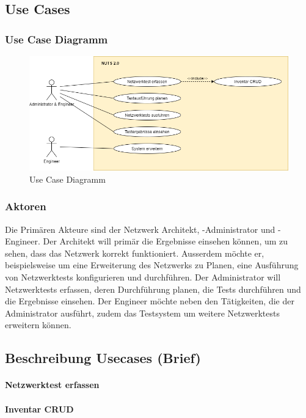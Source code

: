 \documentclass[]{subfiles}
\begin{document}
    \subsection{Use Cases}
    \subsubsection{Use Case Diagramm}
    \begin{figure}[!h] 
        \centering
        \includegraphics[scale=0.6]{../../99_Vorlagen/Bilder/UseCaseDiagram.png}
        \caption{Use Case Diagramm}
    \end{figure}
    \subsubsection{Aktoren}
    Die Primären Akteure sind der Netzwerk Architekt, -Administrator und -Engineer. 
    Der Architekt will primär die Ergebnisse einsehen können, um zu sehen, dass
    das Netzwerk korrekt funktioniert. 
    Ausserdem möchte er, beispielsweise um eine Erweiterung des Netzwerks zu 
    Planen, eine Ausführung von Netzwerktests konfigurieren und durchführen.
    Der Administrator will Netzwerktests erfassen, deren Durchführung planen, 
    die Tests durchführen und die Ergebnisse einsehen.
    Der Engineer möchte neben den Tätigkeiten, die der Administrator ausführt,
    zudem das Testsystem um weitere Netzwerktests erweitern können.

    \subsection{Beschreibung Usecases (Brief)}

        \paragraph{Netzwerktest erfassen}

        \paragraph{Inventar CRUD}
\end{document}
